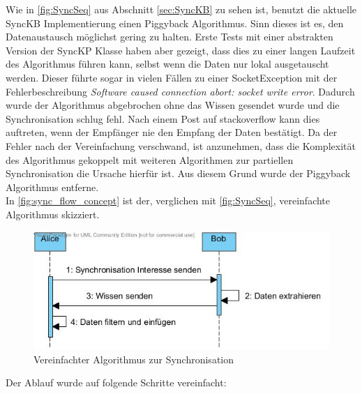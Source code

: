 \documentclass[a4paper]{article}
\begin{document}
	Wie in \autoref{fig:SyncSeq} aus Abschnitt \ref{sec:SyncKB} zu sehen ist,
	benutzt die aktuelle SyncKB Implementierung einen Piggyback Algorithmus.
	Sinn dieses ist es, den Datenaustausch möglichst gering zu halten. Erste Tests
	mit einer abstrakten Version der SyncKP Klasse haben aber gezeigt, dass
	dies zu einer langen Laufzeit des Algorithmus führen kann, selbst wenn die
	Daten nur lokal ausgetauscht werden. Dieser führte sogar in vielen Fällen
	zu einer SocketException mit der Fehlerbeschreibung \emph{Software caused
	connection abort: socket write error}. Dadurch wurde der Algorithmus abgebrochen
	ohne das Wissen gesendet wurde und die Synchronisation schlug fehl. 
	Nach einem Post auf stackoverflow \cite{sockError} kann dies auftreten, wenn 
	der Empfänger nie den Empfang der Daten bestätigt. Da der Fehler nach der
	Vereinfachung verschwand, ist anzunehmen, dass die Komplexität des Algorithmus
	gekoppelt mit weiteren Algorithmen zur partiellen Synchronisation die Ursache
	hierfür ist. Aus diesem Grund wurde der Piggyback Algorithmus entferne.\\
	
	In \autoref{fig:sync_flow_concept} ist der, verglichen mit \autoref{fig:SyncSeq},
	vereinfachte Algorithmus skizziert.
	
	\begin{figure}[H]
		\includegraphics[width=\linewidth]{../Bilder/sync_flow_concept.jpg}
		\caption{Vereinfachter Algorithmus zur Synchronisation}
		\label{fig:sync_flow_concept}
	\end{figure}
	
	Der Ablauf wurde auf folgende Schritte vereinfacht:
	
\end{document}

